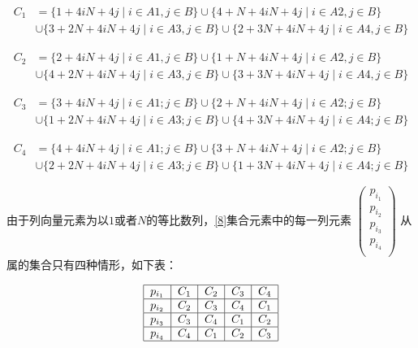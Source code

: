 \documentclass{amsc}          %
\numberwithin{equation}{section} %
\begin{document}
\begin{prof}
\begin{displaymath}
\begin{split}
C_{1} &=\{1+4iN+4j \mid i \in A1,j \in B\}\cup\{4+N+4iN+4j \mid i\in A2,j \in B\}\\
&\cup\{3+2N+4iN+4j \mid i\in A3,j \in B\}\cup\{2+3N+4iN+4j \mid i\in A4,j \in B\}
\end{split}
\end{displaymath}

\begin{displaymath}
\begin{split}
C_{2} &=\{2+4iN+4j \mid i \in A1,j \in B\} \cup\{1+N+4iN+4j \mid i \in A2,j \in B\} \\
&\cup\{4+2N+4iN+4j \mid i \in A3,j \in B\}  \cup\{3+3N+4iN+4j \mid i \in A4,j \in B\}
\end{split}
\end{displaymath}

\begin{displaymath}
\begin{split}
C_{3} &=\{3+4iN+4j \mid i \in A1;j \in B\}  \cup\{2+N+4iN+4j \mid i \in A2; j \in B\} \\
&\cup\{1+2N+4iN+4j \mid i \in A3;j \in B\}  \cup\{4+3N+4iN+4j \mid i \in A4;j \in B\}
\end{split}
\end{displaymath}

\begin{displaymath}
\begin{split}
C_{4} &=\{4+4iN+4j \mid i \in A1;j \in B\}  \cup\{3+N+4iN+4j \mid i \in A2;j \in B\} \\
&\cup\{2+2N+4iN+4j \mid i \in A3;j \in B\}  \cup\{1+3N+4iN+4j \mid i \in A4;j \in B\}
\end{split}
\end{displaymath}


由于列向量元素为以$1$或者$N$的等比数列，\ref{8}集合元素中的每一列元素
$\left(
  \begin{array}{ccc}   %
    p_{i_{1}} \\  %
    p_{i_{2}} \\  %
    p_{i_{3}} \\
    p_{i_{4}} \\
  \end{array}              %
    \right)$
    从属的集合只有四种情形，如下表：

\begin{equation}
\label{table1}\begin{tabular}{|c|c|c|c|c|}%
\hline  %
$p_{i_{1}}$&$C_1$&$C_2$&$C_3$&$C_4$\\
\hline  %
$p_{i_{2}}$&$C_2$&$C_3$&$C_4$&$C_1$\\
\hline %
$p_{i_{3}}$&$C_3$&$C_4$&$C_1$&$C_2$\\
\hline %
$p_{i_{4}}$&$C_4$&$C_1$&$C_2$&$C_3$\\
\hline %
\end{tabular}
\end{equation}



\end{prof}
\end{document}

